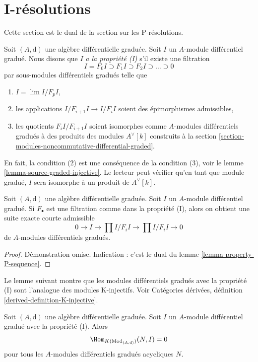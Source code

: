 \section{I-résolutions}
\label{section-I-resolutions}

\noindent
Cette section est le dual de la section sur les P-résolutions.

\medskip\noindent
Soit $(A, \text{d})$ une algèbre différentielle graduée.
Soit $I$ un $A$-module différentiel gradué. Nous disons
que $I$ {\it a la propriété (I)} s'il existe une filtration
$$
I = F_0I \supset F_1I \supset F_2I \supset \ldots \supset 0
$$
par sous-modules différentiels gradués telle que
\begin{enumerate}
\item $I = \lim I/F_pI$,
\item les applications $I/F_{i + 1}I \to I/F_iI$ soient des épimorphismes admissibles,
\item les quotients $F_iI/F_{i + 1}I$ soient isomorphes comme
$A$-modules différentiels gradués à des produits des modules $A^\vee[k]$ construits
à la section \ref{section-modules-noncommutative-differential-graded}.
\end{enumerate}
En fait, la condition (2) est une conséquence de la condition (3),
voir le lemme \ref{lemma-source-graded-injective}. Le lecteur peut vérifier
qu'en tant que module gradué, $I$ sera isomorphe à un produit de $A^\vee[k]$.

\begin{lemma}
\label{lemma-property-I-sequence}
Soit $(A, \text{d})$ une algèbre différentielle graduée.
Soit $I$ un $A$-module différentiel gradué. Si $F_\bullet$ est une
filtration comme dans la propriété (I), alors on obtient
une suite exacte courte admissible
$$
0 \to I \to
\prod\nolimits I/F_iI \to
\prod\nolimits I/F_iI \to 0
$$
de $A$-modules différentiels gradués.
\end{lemma}

\begin{proof}
Démonstration omise. Indication : c'est le dual du lemme \ref{lemma-property-P-sequence}.
\end{proof}

\noindent
Le lemme suivant montre que les modules différentiels gradués avec
la propriété (I) sont l'analogue des modules K-injectifs.
Voir Catégories dérivées, définition \ref{derived-definition-K-injective}.

\begin{lemma}
\label{lemma-property-I-K-injective}
Soit $(A, \text{d})$ une algèbre différentielle graduée.
Soit $I$ un $A$-module différentiel gradué avec la propriété (I).
Alors
$$
\Hom_{K(\text{Mod}_{(A, \text{d})})}(N, I) = 0
$$
pour tous les $A$-modules différentiels gradués acycliques $N$.
\end{lemma}

